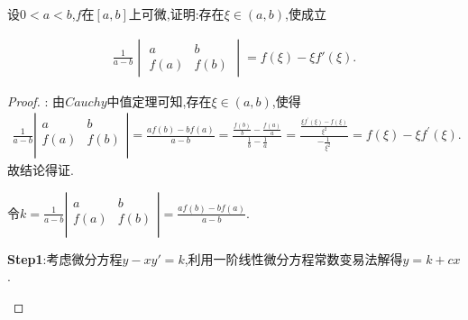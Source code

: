 \documentclass[lang=cn,newtx,10pt,scheme=chinese]{../Template/elegantbook}
\begin{document}
\begin{exercise}
    设\(0 < a < b\),\(f\)在\([a, b]\)上可微,证明:存在\(\xi\in(a, b)\),使成立
    
    \begin{align}
        \frac{1}{a - b} \begin{vmatrix}
    a & b \\
    f(a) & f(b)
    \end{vmatrix} = f(\xi) - \xi f'(\xi).
        \nonumber
    \end{align}
\end{exercise}
\begin{proof}
    {\color{blue} }:
    由$Cauchy$中值定理可知,存在$\xi\in(a,b)$,使得
    \begin{align}
        \frac{1}{a-b}\left| \begin{matrix}
            a&		b\\
            f(a)&		f(b)\\
        \end{matrix} \right|=\frac{af\left( b \right) -bf\left( a \right)}{a-b}=\frac{\frac{f(b)}{b}-\frac{f(a)}{a}}{\frac{1}{b}-\frac{1}{a}}=\frac{\frac{\xi f^{\prime}(\xi )-f(\xi )}{\xi ^2}}{-\frac{1}{\xi ^2}}=f(\xi )-\xi f^{\prime}(\xi ).        
        \nonumber
    \end{align}
    故结论得证.

\begin{note}
    令$k=\frac{1}{a-b}\left| \begin{matrix}
        a&		b\\
        f(a)&		f(b)\\
    \end{matrix} \right|=\frac{af\left( b \right) -bf\left( a \right)}{a-b}$.

        \textbf{Step1}:考虑微分方程$y-xy'=k$,利用一阶线性微分方程常数变易法解得$y=k+cx$.


\end{note}
\end{proof}
\end{document}
